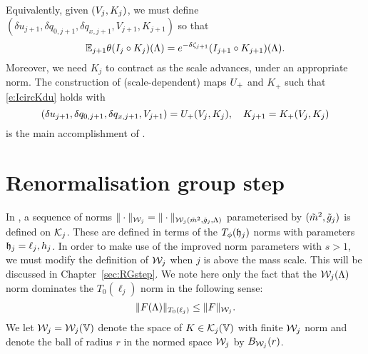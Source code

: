 Equivalently, given $(V_j, K_j)$, we must define
$(\delta u_{j+1}, \delta q_{0,j+1}, \delta q_{x,j+1}, V_{j+1}, K_{j+1})$ so that
\begin{equation} \label{e:IcircKdu}
	\mathbb{E}_{j+1}\theta(I_j \circ K_j)(\Lambda)
	=
	e^{-\delta \zeta_{j+1}}(I_{j+1} \circ K_{j+1})(\Lambda).
\end{equation}
Moreover, we need $K_j$ to contract as the scale advances, under an appropriate norm.
The construction of (scale-dependent) maps $U_+$ and $K_+$ such that
\eqref{e:IcircKdu} holds with
\begin{equation}
(\delta u_{j+1}, \delta q_{0,j+1}, \delta q_{x,j+1}, V_{j+1})
	=
U_+(V_j, K_j),
	\quad
K_{j+1} =  K_+(V_j, K_j)
\end{equation}
is the main accomplishment of \cite{BS-rg-step}.


\section{Renormalisation group step}
\label{sec:step}

In \cite[Section~\ref{step-sec:Knorms}]{BS-rg-step},
a sequence of norms $\|\cdot\|_{\mathcal{W}_j} = \|\cdot\|_{\mathcal{W}_j(\tilde{m}^2, \tilde{g}_j, \Lambda)}$
parameterised by $(\tilde{m}^2, \tilde{g}_j)$ is defined on $\mathcal{K}_j$.
These are defined in terms of the $T_\phi(\mathfrak{h}_j)$ norms with parameters $\mathfrak{h}_j = \ell_j, h_j$.
In order to make use of the improved norm parameters with $s > 1$,
we must modify the definition of $\mathcal{W}_j$ when $j$ is above the mass scale.
This will be discussed in Chapter~\ref{sec:RGstep}.
We note here only the fact that the $\mathcal{W}_j(\Lambda)$
norm dominates the $T_0(\ell_j)$ norm in the following sense:
\begin{equation}
\label{e:T0dom}
\|F(\Lambda)\|_{T_0(\ell_j)} \le \|F\|_{\mathcal{W}_j}.
\end{equation}
We let $\mathcal{W}_j = \mathcal{W}_j(\mathbb{V})$ denote the space of $K\in\mathcal{K}_j(\mathbb{V})$ with
finite $\mathcal{W}_j$ norm and
denote the ball of radius $r$ in the normed space $\mathcal{W}_j$ by $B_{\mathcal{W}_j}(r)$.

